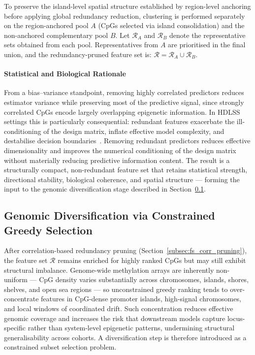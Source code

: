 To preserve the island-level spatial structure established 
by region-level anchoring before applying global redundancy 
reduction, clustering is performed separately on the 
region-anchored pool $A$ (CpGs selected via island 
consolidation) and the non-anchored complementary pool 
$B$. Let $\mathcal{R}_A$ and $\mathcal{R}_B$ denote the 
representative sets obtained from each pool. Representatives 
from $A$ are prioritised in the final union, and the 
redundancy-pruned feature set is:
\(
\mathcal{R}
=
\mathcal{R}_A
\cup
\mathcal{R}_B.
\)

\paragraph{Statistical and Biological Rationale}

From a bias--variance standpoint, removing highly 
correlated predictors reduces estimator variance while 
preserving most of the predictive signal, since strongly 
correlated CpGs encode largely overlapping epigenetic 
information. In HDLSS settings this is particularly 
consequential: redundant features exacerbate the 
ill-conditioning of the design matrix, inflate effective 
model complexity, and destabilise decision 
boundaries~\cite{Donoho2000}. Removing redundant predictors reduces effective dimensionality 
and improves the numerical conditioning of the design matrix 
without materially reducing predictive information content.
The result is a structurally compact, non-redundant 
feature set that retains statistical strength, directional 
stability, biological coherence, and spatial structure — 
forming the input to the genomic diversification stage 
described in Section~\ref{subsec:fs_diversification}.

\subsection{Genomic Diversification via Constrained Greedy Selection}
\label{subsec:fs_diversification}

After correlation-based redundancy pruning
(Section~\ref{subsec:fs_corr_pruning}), the feature set
$\mathcal{R}$ remains enriched for highly ranked CpGs but
may still exhibit structural imbalance. Genome-wide methylation
arrays are inherently non-uniform — CpG density varies
substantially across chromosomes, islands, shores, shelves, and
open sea regions — so unconstrained greedy ranking tends to
over-concentrate features in CpG-dense promoter islands,
high-signal chromosomes, and local windows of coordinated drift.
Such concentration reduces effective genomic coverage and
increases the risk that downstream models capture locus-specific
rather than system-level epigenetic patterns, undermining
structural generalisability across cohorts. A diversification
step is therefore introduced as a constrained subset selection
problem.

